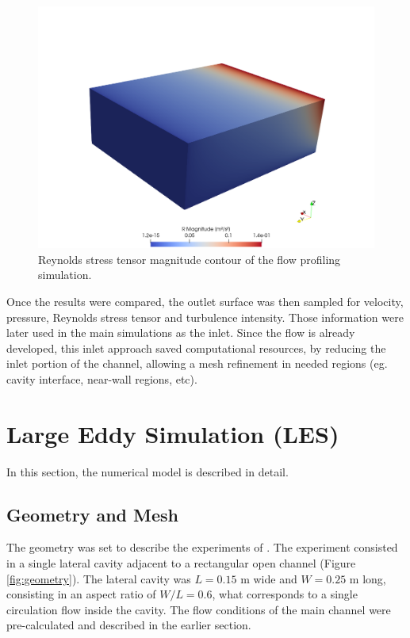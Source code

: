 \documentclass[../main.tex]{subfiles}
\begin{document}
\begin{figure}[!ht]
  \centering
  \includegraphics[width=\linewidth]{../images/methods/flowProfReynoldsStress.png}
  \caption{Reynolds stress tensor magnitude contour of the flow profiling simulation.}
  \label{fig:flowProfReyStress}
\end{figure}

Once the results were compared, the outlet surface was then sampled for velocity, pressure, Reynolds stress tensor and turbulence intensity. Those information were later used in the main simulations as the inlet. Since the flow is already developed, this inlet approach saved computational resources, by reducing the inlet portion of the channel, allowing a mesh refinement in needed regions (eg. cavity interface, near-wall regions, etc).

\section{Large Eddy Simulation (LES)}
In this section, the numerical model is described in detail.

\subsection{Geometry and Mesh}
The geometry was set to describe the experiments of \textcite{xiang2019}. The experiment consisted in a single lateral cavity adjacent to a rectangular open channel (Figure \ref{fig:geometry}). The lateral cavity was $L = 0.15$ m wide and $W = 0.25$ m long, consisting in an aspect ratio of $W/L = 0.6$, what corresponds to a single circulation flow inside the cavity. The flow conditions of the main channel were pre-calculated and described in the earlier section.
\end{document}
